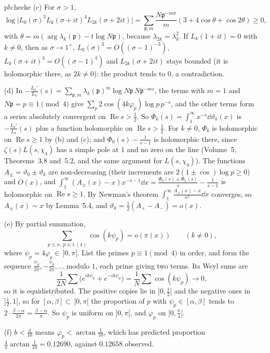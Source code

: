 \begin{solution}{pb:hecke}
(c) For $\sigma>1$,
\[
\log\bigl|L_0(\sigma)^3L_k(\sigma+it)^4L_{2k}(\sigma+2it)\bigr|=\sum_{\mathfrak p,m}\frac{N\mathfrak p^{-m\sigma}}m(3+4\cos\theta+\cos2\theta)\ge0,
\]
with
$\theta=m(\arg\lambda_k(\mathfrak p)-t\log N\mathfrak p)$, because $\lambda_{2k}=\lambda_k^2$. If $L_k(1+it)=0$ with $k\ne0$, then as $\sigma\to1^+$, $L_0(\sigma)^3=O((\sigma-1)^{-3})$,
$L_k(\sigma+it)^4=O((\sigma-1)^4)$ and $L_{2k}(\sigma+2it)$ stays bounded (it is holomorphic there, as $2k\ne0$): the product tends to $0$, a contradiction.

(d) In $-\frac{L_k'}{L_k}(s)=\sum_{\mathfrak p,m}\lambda_k(\mathfrak p)^m\log N\mathfrak p\,N\mathfrak p^{-ms}$, the terms with $m=1$ and $N\mathfrak p=p\equiv1\pmod4$ give $\sum_p2\cos(4k\varphi_p)\log p\,p^{-s}$,
and the other terms form a series absolutely convergent on $\operatorname{Re}s>\frac12$. So $\Phi_k(s)=\int_1^\infty x^{-s}\dd\vartheta_k(x)$ is $-\frac{L_k'}{L_k}(s)$ plus a function holomorphic on
$\operatorname{Re}s>\frac12$. For $k\ne0$, $\Phi_k$ is holomorphic on $\operatorname{Re}s\ge1$ by (b) and (c); and $\Phi_0(s)-\frac1{s-1}$ is holomorphic there, since $\zeta(s)L(s,\chi_4)$ has a
simple pole at $1$ and no zero on the line (Volume~5, Theorems~3.8 and~5.2, and the same argument for $L(s,\chi_4)$). The functions $A_\pm=\vartheta_0\pm\vartheta_k$ are
non-decreasing (their increments are $2(1\pm\cos)\log p\ge0$) and $O(x)$, and $\int_1^\infty(A_\pm(x)-x)x^{-s-1}\dd x=\frac{\Phi_0(s)\pm\Phi_k(s)}s-\frac1{s-1}$ is holomorphic on
$\operatorname{Re}s\ge1$. By Newman's theorem $\int_1^\infty\frac{A_\pm(x)-x}{x^2}\dd x$ converges, so $A_\pm(x)\sim x$ by Lemma~5.4, and $\vartheta_k=\frac12(A_+-A_-)=o(x)$.

(e) By partial summation,
\[
\sum_{p\le x,\ p\equiv1\,(4)}\cos(k\psi_p)=o(\pi(x))\qquad(k\ne0),
\]
where $\psi_p=4\varphi_p\in\,]0,\pi[$. List the primes $p\equiv1\pmod4$ in order, and form the
sequence $\frac{\psi_{p}}{2\pi},-\frac{\psi_{p}}{2\pi},\dots$ modulo $1$, each prime giving two terms. Its Weyl sums are
\[
\frac1{2N}\sum\bigl(e^{ik\psi_p}+e^{-ik\psi_p}\bigr)=\frac1N\sum\cos(k\psi_p)\to0,
\]
so it is equidistributed. The positive copies lie in $]0,\frac12[$ and the negative ones in $]\frac12,1[$, so for $[\alpha,\beta]\subset\,]0,\pi[$ the proportion of $p$ with
$\psi_p\in[\alpha,\beta]$ tends to $2\cdot\frac{\beta-\alpha}{2\pi}=\frac{\beta-\alpha}\pi$. So $\psi_p$ is uniform on $]0,\pi[$, and $\varphi_p$ on $]0,\frac\pi4[$.

(f) $b<\frac a{10}$ means $\varphi_p<\arctan\frac1{10}$, which has predicted proportion $\frac4\pi\arctan\frac1{10}=0.12690$, against $0.12658$ observed.


\end{solution}
